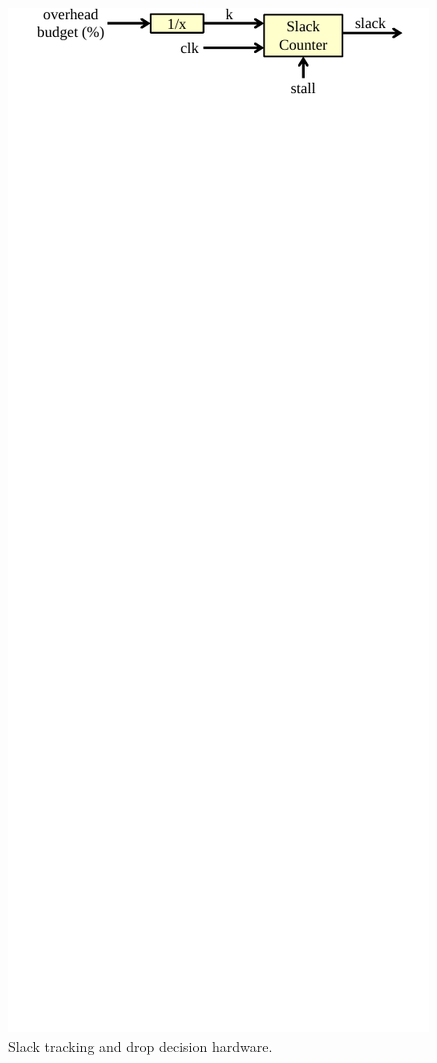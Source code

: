 \begin{figure}
  \begin{center}
    \includegraphics[width=\columnwidth]{figs/stm.pdf}
    \vspace{-0.2in}
    \caption{Slack tracking and drop decision hardware.}
    \label{fig:drop.stm}
    \vspace{-0.1in}
  \end{center}
\end{figure}

